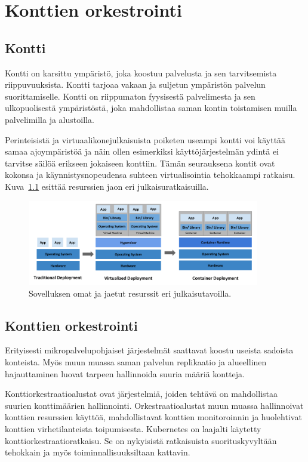 \chapter{Konttien orkestrointi\label{orchestration}}

\section{Kontti}

Kontti on karsittu ympäristö, joka koostuu palvelusta ja sen tarvitsemista riippuvuuksista. Kontti tarjoaa vakaan ja suljetun ympäristön palvelun suorittamiselle. Kontti on riippumaton fyysisestä palvelimesta ja sen ulkopuolisestä ympäristöstä, joka mahdollistaa saman kontin toistamisen muilla palvelimilla ja alustoilla. \cite{Jabbari16}

Perinteisistä ja virtuaalikonejulkaisuista poiketen useampi kontti voi käyttää samaa ajoympäristöä ja näin ollen esimerkiksi käyttöjärjestelmän ydintä ei tarvitse säilöä erikseen jokaiseen konttiin. Tämän seurauksena kontit ovat kokonsa ja käynnistysnopeudensa suhteen virtualisointia tehokkaampi ratkaisu. Kuva~\ref{fig:container} esittää resurssien jaon eri julkaisuratkaisuilla. \cite{Dua14}

\begin{figure}[ht]
\begin{center}
\includegraphics[width=0.9\textwidth]{figures/container_evolution.png}
\caption{Sovelluksen omat ja jaetut resurssit eri julkaisutavoilla.\cite{Kubernetes23}\label{fig:container}}
\end{center}
\end{figure}

\section{Konttien orkestrointi}

Erityisesti mikropalvelupohjaiset järjestelmät saattavat koostu useista sadoista konteista. Myös muun muassa saman palvelun replikaatio ja alueellinen hajauttaminen luovat tarpeen hallinnoida suuria määriä kontteja. \cite{Khan17}

Konttiorkestraatioalustat ovat järjestelmiä, joiden tehtävä on mahdollistaa suurien konttimäärien hallinnointi. Orkestraatioalustat muun muassa hallinnoivat konttien resurssien käyttöä, mahdollistavat konttien monitoroinnin ja huolehtivat konttien virhetilanteista toipumisesta. Kubernetes on laajalti käytetty konttiorkestraatioratkaisu. Se on nykyisistä ratkaisuista suorituskyvyltään tehokkain ja myös toiminnallisuuksiltaan kattavin. \cite{Khan17, Jawarneh19}
